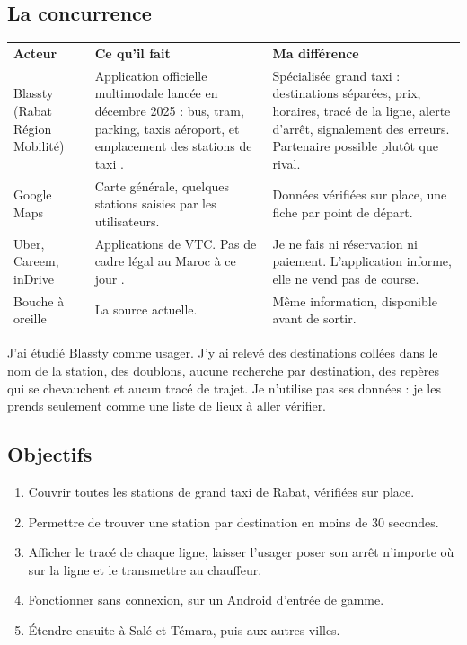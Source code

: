 \documentclass[11pt,a4paper]{article}
\newcommand{\hd}[1]{\textbf{\color{white}#1}}
\newcommand{\hdrow}{\rowcolor{brand}}
\begin{document}
\subsection{La concurrence}
\begin{xltabular}{\textwidth}{@{}P{3.1cm} Y Y@{}}
\hdrow \hd{Acteur} & \hd{Ce qu'il fait} & \hd{Ma différence} \\
Blassty (Rabat Région Mobilité) & Application officielle multimodale lancée en décembre 2025 : bus, tram, parking, taxis aéroport, et emplacement des stations de taxi \cite{mwnblassty}. & Spécialisée grand taxi : destinations séparées, prix, horaires, tracé de la ligne, alerte d'arrêt, signalement des erreurs. Partenaire possible plutôt que rival. \\
Google Maps & Carte générale, quelques stations saisies par les utilisateurs. & Données vérifiées sur place, une fiche par point de départ. \\
Uber, Careem, inDrive & Applications de VTC. Pas de cadre légal au Maroc à ce jour \cite{mwnuber}. & Je ne fais ni réservation ni paiement. L'application informe, elle ne vend pas de course. \\
Bouche à oreille & La source actuelle. & Même information, disponible avant de sortir. \\
\end{xltabular}

J'ai étudié Blassty comme usager. J'y ai relevé des destinations collées dans le nom de la station, des doublons, aucune recherche par destination, des repères qui se chevauchent et aucun tracé de trajet. Je n'utilise pas ses données : je les prends seulement comme une liste de lieux à aller vérifier.

\subsection{Objectifs}
\begin{enumerate}[label=O\arabic*.]
\item Couvrir toutes les stations de grand taxi de Rabat, vérifiées sur place.
\item Permettre de trouver une station par destination en moins de 30 secondes.
\item Afficher le tracé de chaque ligne, laisser l'usager poser son arrêt n'importe où sur la ligne et le transmettre au chauffeur.
\item Fonctionner sans connexion, sur un Android d'entrée de gamme.
\item Étendre ensuite à Salé et Témara, puis aux autres villes.
\end{enumerate}
\end{document}
